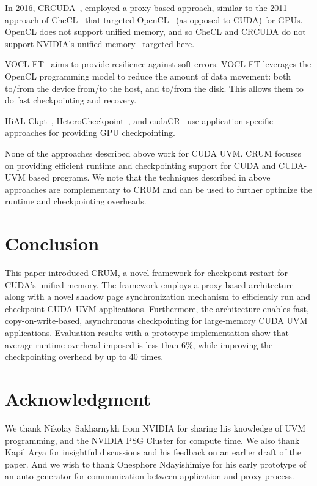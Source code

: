 \documentclass[11pt]{article}
\begin{document}
In 2016, CRCUDA~\cite{gtc2016crcuda}, employed a proxy-based approach,
similar to the 2011 approach of CheCL~\cite{takizawa2011checl}
that targeted OpenCL~\cite{stone2010opencl} (as opposed to CUDA) for GPUs.
OpenCL does not support unified memory, and so
CheCL and CRCUDA do not support NVIDIA's
unified memory~\cite{sakharnykh_gtc_2017} targeted here.


VOCL-FT~\cite{pena2015voclft} aims to provide resilience against
soft errors.  VOCL-FT leverages the OpenCL programming model to
reduce the amount of data movement: both to/from the device from/to
the host, and to/from the disk. This allows them to do fast checkpointing
and recovery.

HiAL-Ckpt~\cite{xu2010hialckpt}, HeteroCheckpoint~\cite{kannan2014heterocheckpoint}, and
cudaCR~\cite{pourghassemi2017cudaCR} use application-specific
approaches for providing GPU checkpointing.

None of the approaches described above work for CUDA UVM. CRUM focuses on
providing efficient runtime and checkpointing support for CUDA and CUDA-UVM
based programs. We note that the techniques described in above approaches are
complementary to CRUM and can be used to further optimize the runtime and
checkpointing overheads.


\section{Conclusion}
\label{sec:conclusion}

This paper introduced CRUM, a novel framework for checkpoint-restart for
CUDA's unified memory. The framework employs a proxy-based architecture
along with a novel shadow page synchronization mechanism to efficiently
run and checkpoint CUDA UVM applications. Furthermore, the architecture
enables fast, copy-on-write-based, asynchronous checkpointing for large-memory
CUDA UVM applications. Evaluation results with a prototype implementation
show that average runtime overhead imposed is less than 6\%, while improving
the checkpointing overhead by up to 40 times.

\section*{Acknowledgment}

We thank Nikolay Sakharnykh from NVIDIA for sharing
his knowledge of UVM programming, and the NVIDIA PSG Cluster for
compute time. We also thank Kapil Arya for insightful discussions and
his feedback on an earlier draft of the paper. And we wish to thank
Onesphore Ndayishimiye for his early prototype of an auto-generator for
communication between application and proxy process.
\end{document}
